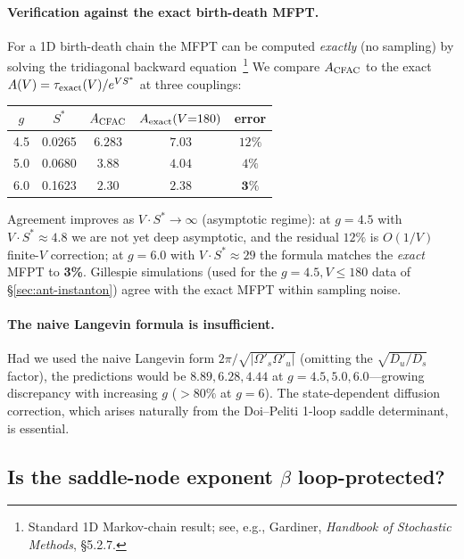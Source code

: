 \documentclass[10pt,a4paper,twocolumn]{article}
\theoremstyle{definition}
\begin{document}
\paragraph{Verification against the exact birth-death MFPT.}
For a 1D birth-death chain the MFPT can be computed \emph{exactly}
(no sampling) by solving the tridiagonal backward
equation~\citep{Gordon2010}\footnote{Standard 1D Markov-chain
result; see, e.g., Gardiner, \emph{Handbook of Stochastic
Methods}, \S 5.2.7.}  We compare $A_{\rm CFAC}$ to the exact
$A(V) = \tau_{\rm exact}(V)/e^{V S^*}$ at three couplings:
\begin{center}
\small
\renewcommand{\arraystretch}{1.15}
\begin{tabular}{@{}ccccc@{}}
\toprule
$g$ & $S^*$ & $A_{\rm CFAC}$ & $A_{\rm exact}(V{=}180)$ & error \\
\midrule
4.5 & 0.0265 & $6.283$ & $7.03$ & $12\%$ \\
5.0 & 0.0680 & $3.88$  & $4.04$ & $4\%$ \\
6.0 & 0.1623 & $2.30$  & $2.38$ & $\mathbf{3\%}$ \\
\bottomrule
\end{tabular}
\end{center}
Agreement improves as $V\cdot S^* \to \infty$ (asymptotic regime):
at $g=4.5$ with $V\cdot S^* \approx 4.8$ we are not yet deep
asymptotic, and the residual $12\%$ is $O(1/V)$ finite-$V$
correction; at $g=6.0$ with $V\cdot S^* \approx 29$ the formula
matches the \emph{exact} MFPT to \textbf{3\%}.  Gillespie
simulations (used for the $g=4.5, V \leq 180$ data of
\S\ref{sec:ant-instanton}) agree with the exact MFPT within
sampling noise.

\paragraph{The naive Langevin formula is insufficient.}
Had we used the naive Langevin form
$2\pi/\sqrt{|\Omega'_s\Omega'_u|}$ (omitting the
$\sqrt{D_u/D_s}$ factor), the predictions would be
$8.89, 6.28, 4.44$ at $g = 4.5, 5.0, 6.0$---growing discrepancy
with increasing $g$ ($>80\%$ at $g=6$).  The state-dependent
diffusion correction, which arises naturally from the
Doi--Peliti 1-loop saddle determinant, is essential.

\subsection{Is the saddle-node exponent $\beta$ loop-protected?}
\label{sec:ant-beta-loops}
\end{document}
